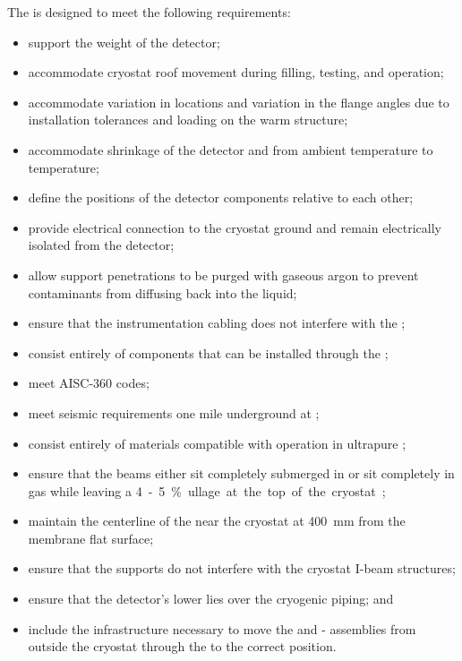 The  is designed to meet the following  requirements:
\begin{itemize}
 \setlength\itemsep{1mm}
\setlength{\parsep}{1mm}
\setlength{\itemsep}{-5mm}
\item support the weight of the detector;
\item accommodate cryostat roof movement during filling, testing, and operation;
\item accommodate variation in \fdth locations and
  variation in the flange angles due to installation tolerances and
  loading on the warm structure;
\item accommodate shrinkage of the detector and  from ambient
  temperature to  temperature;
\item define the positions of the detector components relative to each other; 
\item provide electrical connection to the cryostat ground and remain electrically isolated from the detector;
\item allow support penetrations to be purged with gaseous argon to prevent contaminants from diffusing back into the liquid; 
\item ensure that the instrumentation cabling does not interfere with the ;
\item consist entirely of components that can  
be installed through the ;
\item meet AISC-360 codes; 
\item meet seismic requirements one mile underground at ;
\item consist entirely of materials compatible %
with operation in ultrapure ;
\item ensure that the  beams either sit completely submerged in  or sit completely in gas while leaving a \SI{4}-\SI{5}{\%} ullage at the top of the cryostat;  
\item maintain the centerline of the  near the cryostat at \SI{400}{mm} from the membrane flat surface;
\item ensure that the supports do not interfere with the cryostat I-beam structures;
\item ensure that the detector's lower  lies over the cryogenic piping; and
\item include the infrastructure necessary to move the  and - assemblies from outside the cryostat through the  to the correct position.
\end{itemize}

